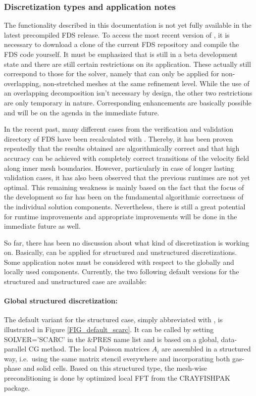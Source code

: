 \subsubsection{Discretization types and application notes}
\label{SEC_SCARC_application_notes}

The \scarc{} functionality described in this documentation is not yet fully available in the latest precompiled FDS release.
To access the most recent version of \scarc{}, it is necessary to download a clone of the current FDS repository and compile the FDS code yourself. 
It must be emphasized that \scarc{} is still in a beta development state and there are still certain restrictions on its application. These actually still correspond to those for the \uglmat{} solver, namely that \scarc{} can only be applied for non-overlapping, non-stretched meshes at the same refinement level. While the use of an overlapping decomposition isn't necessary by design, the other two restrictions are only temporary in nature. Corresponding enhancements are basically possible and will be on the agenda in the immediate future.

In the recent past, many different cases from the verification and validation directory of FDS have been recalculated with \scarc{}.
Thereby, it has been proven repeatedly that the results obtained are algorithmically correct and that high accuracy can be achieved with completely correct transitions of the velocity field along inner mesh boundaries.
\newpage
However, particularly in case of longer lasting validation cases, it has also been observed that the previous runtimes are not yet optimal. This remaining weakness is mainly based on the fact that the focus of the development so far has been on the fundamental algorithmic correctness of the individual solution components. Nevertheless, there is still a great potential for runtime improvements and appropriate improvements will be done in the immediate future as well.

So far, there has been no discussion about what kind of discretization \scarc{} is working on. 
Basically, \scarc{} can be applied for structured and unstructured discretizations. Some application notes must be considered with respect to the globally and locally used components. Currently, the two following default versions for the structured and unstructured case are available:

\paragraph{Global structured discretization:}
The default variant for the structured case, simply abbreviated with \scarc{}, is illustrated in Figure \ref{FIG_default_scarc}. It can be called by setting {\ct SOLVER='SCARC'} in the {\ct \&PRES} name list and is based on a global, data-parallel CG method. The local Poisson matrices $A_i$ are assembled in a structured way, i.e.\ using the same matrix stencil everywhere and incorporating both gas-phase and solid cells.
Based on this structured type, the mesh-wise preconditioning is done by optimized local FFT from the CRAYFISHPAK package. 

